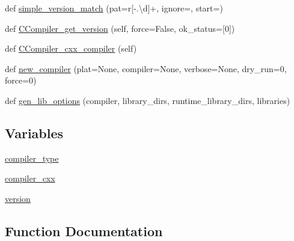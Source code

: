 \begin{DoxyCompactItemize}
def \hyperlink{namespacenumpy_1_1distutils_1_1ccompiler_a9d85279677a92edd41991fc208064fcb}{simple\+\_\+version\+\_\+match} (pat=r\textquotesingle{}\mbox{[}-\/.\textbackslash{}d\mbox{]}+\textquotesingle{}, ignore=\textquotesingle{}\textquotesingle{}, start=\textquotesingle{}\textquotesingle{})
\item 
def \hyperlink{namespacenumpy_1_1distutils_1_1ccompiler_a872f06ad4c12afcc6a5ec593beb094f7}{C\+Compiler\+\_\+get\+\_\+version} (self, force=False, ok\+\_\+status=\mbox{[}0\mbox{]})
\item 
def \hyperlink{namespacenumpy_1_1distutils_1_1ccompiler_a8c592aae01388179193dcf05d400f4a9}{C\+Compiler\+\_\+cxx\+\_\+compiler} (self)
\item 
def \hyperlink{namespacenumpy_1_1distutils_1_1ccompiler_a4335f325ef55e763565b3f858da1f592}{new\+\_\+compiler} (plat=None, compiler=None, verbose=None, dry\+\_\+run=0, force=0)
\item 
def \hyperlink{namespacenumpy_1_1distutils_1_1ccompiler_a68159259c38dbd2f04a6c53f2c73113a}{gen\+\_\+lib\+\_\+options} (compiler, library\+\_\+dirs, runtime\+\_\+library\+\_\+dirs, libraries)
\end{DoxyCompactItemize}
\subsection*{Variables}
\begin{DoxyCompactItemize}
\item 
\hyperlink{namespacenumpy_1_1distutils_1_1ccompiler_aba5c6c73e34a562f7287eed1cc0ff7f2}{compiler\+\_\+type}
\item 
\hyperlink{namespacenumpy_1_1distutils_1_1ccompiler_a8c888df935067ddaf7e96a73aad727b2}{compiler\+\_\+cxx}
\item 
\hyperlink{namespacenumpy_1_1distutils_1_1ccompiler_a61fee1323b0ffc31ac0ffa7902d1ae24}{version}
\end{DoxyCompactItemize}


\subsection{Function Documentation}
\mbox{\label{namespacenumpy_1_1distutils_1_1ccompiler_a3e609541af4c13a3cac3a96b2bcd8e64}} 
